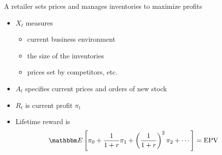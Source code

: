 \begin{frame}

    \Eg A retailer sets prices and manages inventories to maximize profits

    \begin{itemize}
        \item $X_t$ measures 
            \begin{itemize}
                \item current business environment
            \vspace{0.3em}
                \item the size of the inventories
            \vspace{0.3em}
                \item prices set by competitors, etc. 
            \end{itemize}
            \vspace{0.3em}
        \item $A_t$ specifies current prices and orders of new stock
            \vspace{0.3em}
            \vspace{0.3em}
        \item $R_t$ is current profit $\pi_t$
            \vspace{0.3em}
            \vspace{0.3em}
        \item Lifetime reward is 
            \begin{equation*}
                \EE \left[ \pi_0 + \frac{1}{1+r} \pi_1 
                    + \left(\frac{1}{1+r}\right)^2 \pi_2
                    + \cdots \right]
                    = \text{EPV}
            \end{equation*}
    \end{itemize}


\end{frame}
















